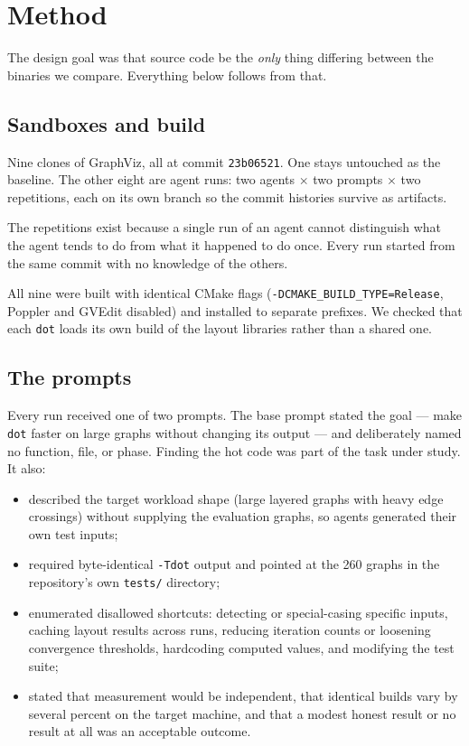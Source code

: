 \section{Method}
\label{sec:method}

The design goal was that source code be the \emph{only} thing differing between
the binaries we compare. Everything below follows from that.

\subsection{Sandboxes and build}

Nine clones of GraphViz, all at commit \texttt{23b06521}. One stays untouched as
the baseline. The other eight are agent runs: two agents $\times$ two prompts
$\times$ two repetitions, each on its own branch so the commit histories survive
as artifacts.

The repetitions exist because a single run of an agent cannot distinguish what
the agent tends to do from what it happened to do once. Every run started from
the same commit with no knowledge of the others.

All nine were built with identical CMake flags
(\texttt{-DCMAKE\_BUILD\_TYPE=Release}, Poppler and GVEdit disabled) and
installed to separate prefixes. We checked that each \texttt{dot} loads its own
build of the layout libraries rather than a shared one.

\subsection{The prompts}

Every run received one of two prompts. The base prompt stated the goal --- make
\texttt{dot} faster on large graphs without changing its output --- and
deliberately named no function, file, or phase. Finding the hot code was part of
the task under study. It also:

\begin{itemize}
\item described the target workload shape (large layered graphs with heavy edge
      crossings) without supplying the evaluation graphs, so agents generated
      their own test inputs;
\item required byte-identical \texttt{-Tdot} output and pointed at the 260
      graphs in the repository's own \texttt{tests/} directory;
\item enumerated disallowed shortcuts: detecting or special-casing specific
      inputs, caching layout results across runs, reducing iteration counts or
      loosening convergence thresholds, hardcoding computed values, and
      modifying the test suite;
\item stated that measurement would be independent, that identical builds vary
      by several percent on the target machine, and that a modest honest result
      or no result at all was an acceptable outcome.
\end{itemize}

